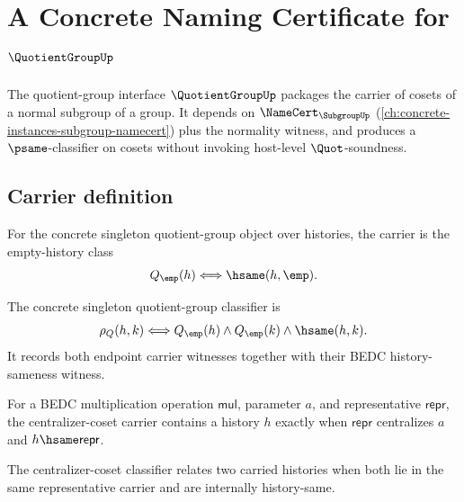 \chapter{A Concrete Naming Certificate for $\QuotientGroupUp$}
\label{ch:concrete-instances-quotientgroup-namecert}

The quotient-group interface $\QuotientGroupUp$ packages the carrier of cosets of a normal subgroup of a group. It depends on $\NameCert_{\SubgroupUp}$ (\autoref{ch:concrete-instances-subgroup-namecert}) plus the normality witness, and produces a $\psame$-classifier on cosets without invoking host-level $\Quot$-soundness.

\section{Carrier definition}
\label{sec:quotientgroup-carrier}

\begin{definition}
\label{def:quotientgroup-singleton-carrier}
For the concrete singleton quotient-group object over histories, the carrier is
the empty-history class
$$
Q_{\emp}(h)\Longleftrightarrow \hsame(h,\emp).
$$
\end{definition}

\begin{definition}
\label{def:quotientgroup-singleton-classifier}
The concrete singleton quotient-group classifier is
$$
\rho_Q(h,k)\Longleftrightarrow
Q_{\emp}(h)\land Q_{\emp}(k)\land \hsame(h,k).
$$
It records both endpoint carrier witnesses together with their BEDC
history-sameness witness.
\end{definition}

\begin{definition}
\label{def:quotientgroup-centralizer-coset-carrier}
For a BEDC multiplication operation $\mathsf{mul}$, parameter $a$, and
representative $\mathsf{repr}$, the centralizer-coset carrier contains a
history $h$ exactly when $\mathsf{repr}$ centralizes $a$ and
$h\hsame\mathsf{repr}$.
\end{definition}

\begin{definition}
\label{def:quotientgroup-centralizer-coset-classifier}
The centralizer-coset classifier relates two carried histories when both lie
in the same representative carrier and are internally history-same.
\end{definition}

